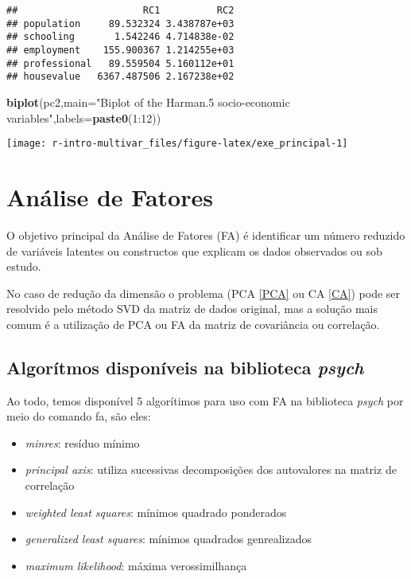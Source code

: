 \documentclass[]{book}
\newenvironment{Shaded}{\begin{snugshade}}{\end{snugshade}}
\newcommand{\KeywordTok}[1]{\textcolor[rgb]{0.13,0.29,0.53}{\textbf{{#1}}}}
\newcommand{\DataTypeTok}[1]{\textcolor[rgb]{0.13,0.29,0.53}{{#1}}}
\newcommand{\DecValTok}[1]{\textcolor[rgb]{0.00,0.00,0.81}{{#1}}}
\newcommand{\StringTok}[1]{\textcolor[rgb]{0.31,0.60,0.02}{{#1}}}
\newcommand{\NormalTok}[1]{{#1}}
\providecommand{\tightlist}{%
  \setlength{\itemsep}{0pt}\setlength{\parskip}{0pt}}
\begin{document}
\begin{verbatim}
##                      RC1          RC2
## population     89.532324 3.438787e+03
## schooling       1.542246 4.714838e-02
## employment    155.900367 1.214255e+03
## professional   89.559504 5.160112e+01
## housevalue   6367.487506 2.167238e+02
\end{verbatim}

\begin{Shaded}
\begin{Highlighting}[]
\KeywordTok{biplot}\NormalTok{(pc2,}\DataTypeTok{main=}\StringTok{"Biplot of the Harman.5 socio-economic variables"}\NormalTok{,}\DataTypeTok{labels=}\KeywordTok{paste0}\NormalTok{(}\DecValTok{1}\NormalTok{:}\DecValTok{12}\NormalTok{))}
\end{Highlighting}
\end{Shaded}

\begin{center}\texttt{[image: r-intro-multivar\_files/figure-latex/exe\_principal-1]} \end{center}

\chapter{Análise de Fatores}\label{FA}

O objetivo principal da Análise de Fatores (FA) é identificar um número
reduzido de variáveis latentes ou constructos que explicam os dados
observados ou sob estudo.

No caso de redução da dimensão o problema (PCA \ref{PCA} ou CA \ref{CA})
pode ser resolvido pelo método SVD da matriz de dados original, mas a
solução mais comum é a utilização de PCA ou FA da matriz de covariância
ou correlação.

\section{\texorpdfstring{Algorítmos disponíveis na biblioteca
\emph{psych}}{Algorítmos disponíveis na biblioteca psych}}\label{algoritmos-disponiveis-na-biblioteca-psych}

Ao todo, temos disponível 5 algorítimos para uso com FA na biblioteca
\emph{psych} por meio do comando fa, são eles:

\begin{itemize}
\tightlist
\item
  \emph{minres}: resíduo mínimo
\item
  \emph{principal axis}: utiliza sucessivas decomposições dos
  autovalores na matriz de correlação
\item
  \emph{weighted least squares}: mínimos quadrado ponderados
\item
  \emph{generalized least squares}: mínimos quadrados genrealizados
\item
  \emph{maximum likelihood}: máxima verossimilhança
\end{itemize}
\end{document}
